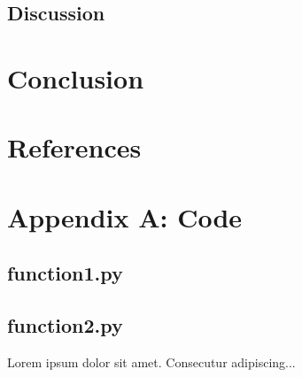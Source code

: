 \documentclass[sigplan]{acmart}
\begin{document}
  	 \subsection{Discussion}
  
  \section{Conclusion}
  
  \section{References}
  
  \section{Appendix A: Code}
  	\subsection{function1.py}
  	\subsection{function2.py}
   
  
  
  

  Lorem ipsum dolor sit amet. Consecutur adipiscing...
\end{document}
